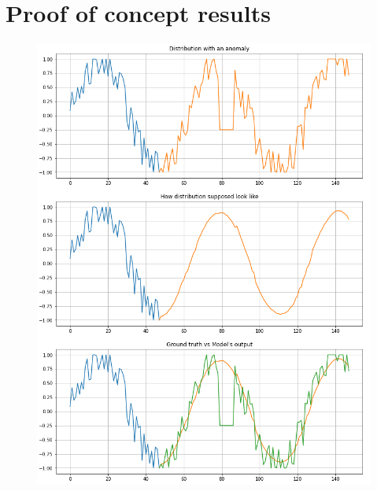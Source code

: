 {\let\clearpage\relax\chapter{Proof of concept results}\label{appendix:poc-results}}

\begin{figure}[H]
    \includegraphics[width=14cm]{assets/appendix/poc-results.png}
\end{figure}